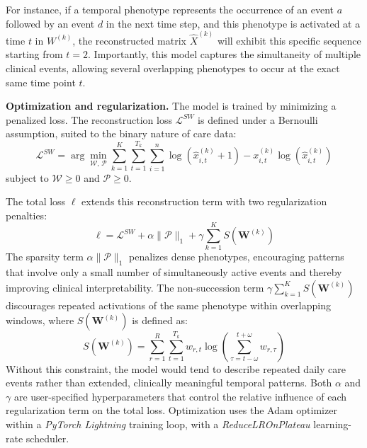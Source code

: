 \documentclass[pdflatex,sn-mathphys-num,referee,lineno]{sn-jnl}
\newcommand{\proglang}[1]{\textit{#1}}
\begin{document}
For instance, if a temporal phenotype represents the occurrence of an event $a$ followed by an event $d$ in the next time step, and this phenotype is activated at a time $t$ in $W^{(k)}$, the reconstructed matrix $\widehat{X}^{(k)}$ will exhibit this specific sequence starting from $t=2$. Importantly, this model captures the simultaneity of multiple clinical events, allowing several overlapping phenotypes to occur at the exact same time point $t$.

\textbf{Optimization and regularization.}
The model is trained by minimizing a penalized loss.
The reconstruction loss $\mathcal{L}^{SW}$ is defined under a Bernoulli assumption, suited to the binary nature of care data:
\begin{equation}
  \mathcal{L}^{SW} = \arg\min_{\mathcal{W},\,\mathcal{P}} \sum_{k=1}^{K} \sum_{t=1}^{T_k} \sum_{i=1}^{n} \log\!\left(\hat{x}^{(k)}_{i,t} + 1\right) - x^{(k)}_{i,t} \log\!\left(\hat{x}^{(k)}_{i,t}\right)
  \label{eq:recon_loss}
\end{equation}
subject to $\mathcal{W} \geq 0$ and $\mathcal{P} \geq 0$.

The total loss $\ell$ extends this reconstruction term with two regularization penalties:
\begin{equation}
  \ell = \mathcal{L}^{SW} + \alpha \|\mathcal{P}\|_1 + \gamma \sum_{k=1}^{K} S\!\left(\boldsymbol{W}^{(k)}\right)
  \label{eq:loss}
\end{equation}
The sparsity term $\alpha \|\mathcal{P}\|_1$ penalizes dense phenotypes, encouraging patterns that involve only a small number of simultaneously active events and thereby improving clinical interpretability.
The non-succession term $\gamma \sum_{k=1}^{K} S(\boldsymbol{W}^{(k)})$ discourages repeated activations of the same phenotype within overlapping windows, where $S(\boldsymbol{W}^{(k)})$ is defined as:
\begin{equation}
  S\!\left(\boldsymbol{W}^{(k)}\right) = \sum_{r=1}^{R} \sum_{t=1}^{T_k}
  w_{r,t} \log\!\left(\sum_{\tau=t-\omega}^{t+\omega} w_{r,\tau}\right)
  \label{eq:non_succession}
\end{equation}
Without this constraint, the model would tend to describe repeated daily care events rather than extended, clinically meaningful temporal patterns.
Both $\alpha$ and $\gamma$ are user-specified hyperparameters that control the relative influence of each regularization term on the total loss.
Optimization uses the Adam optimizer within a \proglang{PyTorch Lightning} training loop, with a \emph{ReduceLROnPlateau} learning-rate scheduler.
\end{document}
